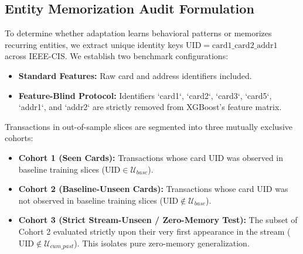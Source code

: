 \documentclass[10pt,conference,compsoc]{IEEEtran}
\begin{document}
\subsection{Entity Memorization Audit Formulation}
To determine whether adaptation learns behavioral patterns or memorizes recurring entities, we extract unique identity keys $\text{UID} = \text{card1}\_\text{card2}\_\text{addr1}$ across IEEE-CIS. We establish two benchmark configurations:
\begin{itemize}
    \item \textbf{Standard Features:} Raw card and address identifiers included.
    \item \textbf{Feature-Blind Protocol:} Identifiers `card1`, `card2`, `card3`, `card5`, `addr1`, and `addr2` are strictly removed from XGBoost's feature matrix.
\end{itemize}
Transactions in out-of-sample slices are segmented into three mutually exclusive cohorts:
\begin{itemize}
    \item \textbf{Cohort 1 (Seen Cards):} Transactions whose card UID was observed in baseline training slices ($\text{UID} \in \mathcal{U}_{base}$).
    \item \textbf{Cohort 2 (Baseline-Unseen Cards):} Transactions whose card UID was not observed in baseline training slices ($\text{UID} \notin \mathcal{U}_{base}$).
    \item \textbf{Cohort 3 (Strict Stream-Unseen / Zero-Memory Test):} The subset of Cohort 2 evaluated strictly upon their very first appearance in the stream ($\text{UID} \notin \mathcal{U}_{cum\_past}$). This isolates pure zero-memory generalization.
\end{itemize}
\end{document}
